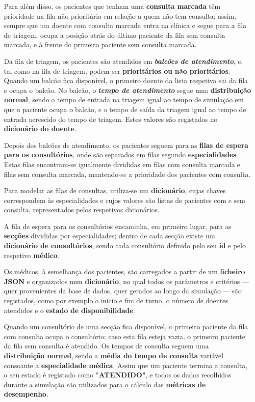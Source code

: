 \documentclass[12pt,a4paper]{article} %
\begin{document}
Para além disso, os pacientes que tenham uma \textbf{consulta marcada} têm prioridade na fila não prioritária em relação a quem não tem consulta; assim, sempre que um doente com consulta marcada entra na clínica e segue para a fila de triagem, ocupa a posição atrás do último paciente da fila sem consulta marcada, e à frente do primeiro paciente sem consulta marcada. 

Da fila de triagem, os pacientes são atendidos em \textbf{\emph{balcões de atendimento}}, e, tal como na fila de triagem, podem ser \textbf{prioritários ou não prioritários}. Quando um balcão fica disponível, o primeiro doente da lista respetiva sai da fila e ocupa o balcão. No balcão, o \textbf{\emph{tempo de atendimento}} segue uma \textbf{distribuição normal}, sendo o tempo de entrada na triagem igual ao tempo de simulação em que o paciente ocupa o balcão, e o tempo de saída da triagem igual ao tempo de entrada acrescido do tempo de triagem. Estes valores são registados no \textbf{dicionário do doente}.
    
\medskip
Depois dos balcões de atendimento, os pacientes seguem para as \textbf{filas de espera para os consultórios}, onde são separados em filas segundo \textbf{especialidades}. Estas filas encontram-se igualmente divididas em filas com consulta marcada e filas sem consulta marcada, mantendo-se a prioridade dos pacientes com consulta. 

Para modelar as filas de consultas, utiliza-se um \textbf{dicionário}, cujas chaves correspondem às especialidades e cujos valores são listas de pacientes com e sem consulta, representados pelos respetivos dicionários.
   
\medskip
A fila de espera para os consultórios encaminha, em primeiro lugar, para as \textbf{secções} divididas por especialidades; dentro de cada secção existe um \textbf{dicionário de consultórios}, sendo cada consultório definido pelo seu \textbf{id} e pelo respetivo \textbf{médico}. 
    
\medskip
Os médicos, à semelhança dos pacientes, são carregados a partir de um \textbf{ficheiro JSON} e organizados num \textbf{dicionário}, no qual todos os parâmetros e critérios — quer provenientes da base de dados, quer gerados ao longo da simulação — são registados, como por exemplo o início e fim de turno, o número de doentes atendidos e o \textbf{estado de disponibilidade}.
    
\medskip
Quando um consultório de uma secção fica disponível, o primeiro paciente da fila com consulta ocupa o consultório; caso esta fila esteja vazia, o primeiro paciente da fila sem consulta é atendido. Os tempos de consulta seguem uma \textbf{distribuição normal}, sendo a \textbf{média do tempo de consulta} variável consoante a \textbf{especialidade médica}. Assim que um paciente termina a consulta, o seu estado é registado como \textbf{"ATENDIDO"}, e todos os dados recolhidos durante a simulação são utilizados para o cálculo das \textbf{métricas de desempenho}.
    
\end{document}
